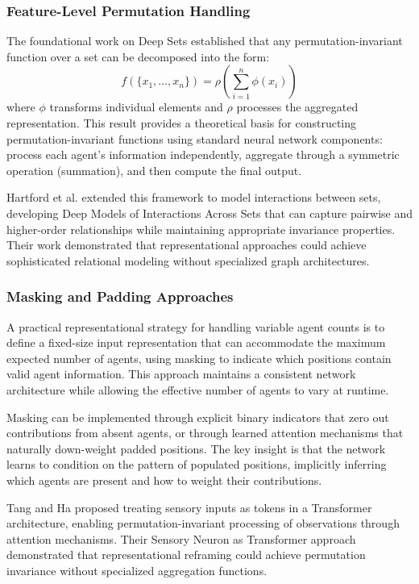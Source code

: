 \subsubsection{Feature-Level Permutation Handling}

The foundational work on Deep Sets \cite{zaheer2017} established
that any permutation-invariant function over a set can be
decomposed into the form:
\begin{equation}
    f(\{x_1, \ldots, x_n\}) = \rho\left( \sum_{i=1}^{n} \phi(x_i) \right)
\end{equation}
where $\phi$ transforms individual elements and $\rho$ processes
the aggregated representation. This result provides a theoretical
basis for constructing permutation-invariant functions using
standard neural network components: process each agent's
information independently, aggregate through a symmetric
operation (summation), and then compute the final output.

Hartford et al. \cite{hartford2018} extended this framework to
model interactions between sets, developing Deep Models of
Interactions Across Sets that can capture pairwise and
higher-order relationships while maintaining appropriate
invariance properties. Their work demonstrated that
representational approaches could achieve sophisticated
relational modeling without specialized graph architectures.

\subsubsection{Masking and Padding Approaches}

A practical representational strategy for handling variable
agent counts is to define a fixed-size input representation
that can accommodate the maximum expected number of agents,
using masking to indicate which positions contain valid agent
information. This approach maintains a consistent network
architecture while allowing the effective number of agents
to vary at runtime.

Masking can be implemented through explicit binary indicators
that zero out contributions from absent agents, or through
learned attention mechanisms that naturally down-weight padded
positions. The key insight is that the network learns to
condition on the pattern of populated positions, implicitly
inferring which agents are present and how to weight their
contributions.

Tang and Ha \cite{tang2021} proposed treating sensory inputs
as tokens in a Transformer architecture, enabling permutation-invariant
processing of observations through attention mechanisms. Their
Sensory Neuron as Transformer approach demonstrated that
representational reframing could achieve permutation invariance
without specialized aggregation functions.

